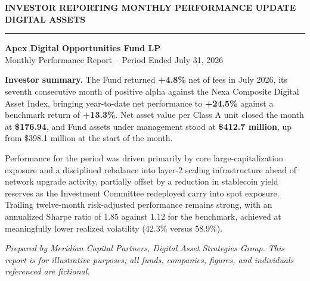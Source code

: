 \thispagestyle{firstpage}

\begin{center}
{\sffamily\small\color{slateink}\bfseries INVESTOR REPORTING \quad\textbullet\quad MONTHLY PERFORMANCE UPDATE \quad\textbullet\quad DIGITAL ASSETS}\\[4pt]
{\color{synapseteal}\rule{\linewidth}{0.8pt}}
\end{center}

\vspace{4pt}
{\sffamily\Large\bfseries\color{meridiannavy} Apex Digital Opportunities Fund LP}\\[2pt]
{\sffamily\large\color{slateink} Monthly Performance Report -- Period Ended July 31, 2026}

\vspace{6pt}
\noindent\begin{minipage}[t]{0.58\linewidth}

\vspace{5pt}
\textbf{Investor summary.} The Fund returned \textbf{+4.8\%} net of fees in July 2026, its seventh consecutive month of positive alpha against the Nexa Composite Digital Asset Index, bringing year-to-date net performance to \textbf{+24.5\%} against a benchmark return of \textbf{+13.3\%}. Net asset value per Class A unit closed the month at \textbf{\$176.94}, and Fund assets under management stood at \textbf{\$412.7 million}, up from \$398.1 million at the start of the month.

Performance for the period was driven primarily by core large-capitalization exposure and a disciplined rebalance into layer-2 scaling infrastructure ahead of network upgrade activity, partially offset by a reduction in stablecoin yield reserves as the Investment Committee redeployed carry into spot exposure. Trailing twelve-month risk-adjusted performance remains strong, with an annualized Sharpe ratio of 1.85 against 1.12 for the benchmark, achieved at meaningfully lower realized volatility (42.3\% versus 58.9\%).

\vspace{2pt}
{\scriptsize\color{slateink}\itshape Prepared by Meridian Capital Partners, Digital Asset Strategies Group. This report is for illustrative purposes; all funds, companies, figures, and individuals referenced are fictional.}
\end{minipage}\hfill
